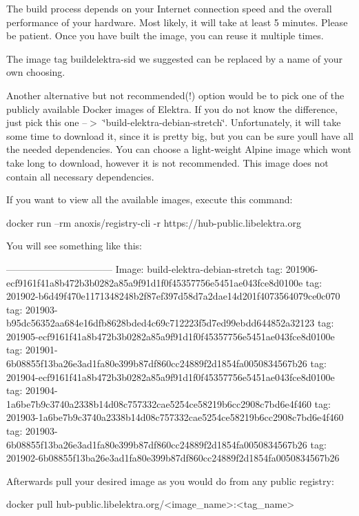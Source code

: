 The build process depends on your Internet connection speed and the overall performance of your hardware. Most likely, it will take at least 5 minutes. Please be patient. Once you have built the image, you can reuse it multiple times.

The image tag {\ttfamily buildelektra-\/sid} we suggested can be replaced by a name of your own choosing.

Another alternative but not recommended(!) option would be to pick one of the publicly available Docker images of Elektra. If you do not know the difference, just pick this one --$>$ \char`\"{}build-\/elektra-\/debian-\/stretch\char`\"{}. Unfortunately, it will take some time to download it, since it is pretty big, but you can be sure you\textquotesingle{}ll have all the needed dependencies. You can choose a light-\/weight Alpine image which won\textquotesingle{}t take long to download, however it is not recommended. This image does not contain all necessary dependencies.

If you want to view all the available images, execute this command\+:


\begin{DoxyCode}
docker run --rm anoxis/registry-cli -r https://hub-public.libelektra.org
\end{DoxyCode}


You will see something like this\+:


\begin{DoxyCode}
---------------------------------
Image: build-elektra-debian-stretch
  tag: 201906-ecf9161f41a8b472b3b0282a85a9f91d1f0f45357756e5451ae043fce8d0100e
  tag: 201902-b6d49f470e1171348248b2f87ef397d58d7a2dae14d201f4073564079ce0c070
  tag: 201903-b95dc56352aa684e16dfb8628bded4c69c712223f5d7ed99ebdd644852a32123
  tag: 201905-ecf9161f41a8b472b3b0282a85a9f91d1f0f45357756e5451ae043fce8d0100e
  tag: 201901-6b08855f13ba26e3ad1fa80e399b87df860cc24889f2d1854fa0050834567b26
  tag: 201904-ecf9161f41a8b472b3b0282a85a9f91d1f0f45357756e5451ae043fce8d0100e
  tag: 201904-1a6be7b9c3740a2338b14d08c757332cae5254ce58219b6cc2908c7bd6e4f460
  tag: 201903-1a6be7b9c3740a2338b14d08c757332cae5254ce58219b6cc2908c7bd6e4f460
  tag: 201903-6b08855f13ba26e3ad1fa80e399b87df860cc24889f2d1854fa0050834567b26
  tag: 201902-6b08855f13ba26e3ad1fa80e399b87df860cc24889f2d1854fa0050834567b26
\end{DoxyCode}


Afterwards pull your desired image as you would do from any public registry\+:


\begin{DoxyCode}
docker pull hub-public.libelektra.org/<image\_name>:<tag\_name>
\end{DoxyCode}


